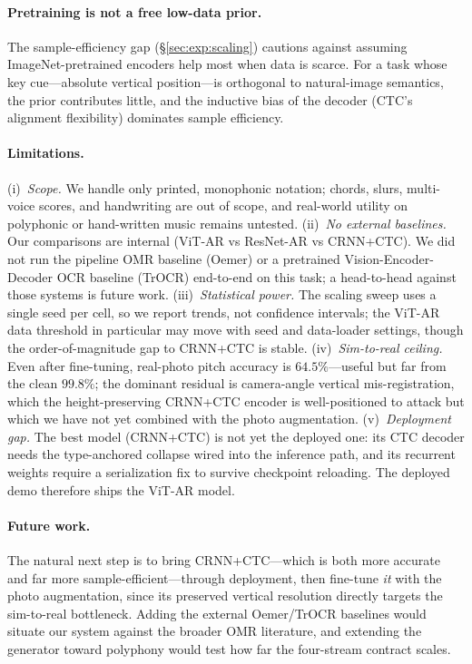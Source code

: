 \paragraph{Pretraining is not a free low-data prior.} The sample-efficiency gap
(\S\ref{sec:exp:scaling}) cautions against assuming ImageNet-pretrained encoders
help most when data is scarce. For a task whose key cue---absolute vertical
position---is orthogonal to natural-image semantics, the prior contributes little,
and the inductive bias of the decoder (CTC's alignment flexibility) dominates
sample efficiency.

\paragraph{Limitations.} (i)~\emph{Scope.} We handle only printed, monophonic
notation; chords, slurs, multi-voice scores, and handwriting are out of scope, and
real-world utility on polyphonic or hand-written music remains untested.
(ii)~\emph{No external baselines.} Our comparisons are internal (ViT-AR vs
ResNet-AR vs CRNN+CTC). We did not run the pipeline OMR baseline (Oemer) or a
pretrained Vision-Encoder-Decoder OCR baseline (TrOCR) end-to-end on this task; a
head-to-head against those systems is future work. (iii)~\emph{Statistical power.}
The scaling sweep uses a single seed per cell, so we report trends, not confidence
intervals; the ViT-AR data threshold in particular may move with seed and
data-loader settings, though the order-of-magnitude gap to CRNN+CTC is stable.
(iv)~\emph{Sim-to-real ceiling.} Even after fine-tuning, real-photo pitch accuracy
is $64.5\%$---useful but far from the clean $99.8\%$; the dominant residual is
camera-angle vertical mis-registration, which the height-preserving CRNN+CTC
encoder is well-positioned to attack but which we have not yet combined with the
photo augmentation. (v)~\emph{Deployment gap.} The best model (CRNN+CTC) is not
yet the deployed one: its CTC decoder needs the type-anchored collapse wired into
the inference path, and its recurrent weights require a serialization fix to
survive checkpoint reloading. The deployed demo therefore ships the ViT-AR model.

\paragraph{Future work.} The natural next step is to bring CRNN+CTC---which is both
more accurate and far more sample-efficient---through deployment, then fine-tune
\emph{it} with the photo augmentation, since its preserved vertical resolution
directly targets the sim-to-real bottleneck. Adding the external Oemer/TrOCR
baselines would situate our system against the broader OMR literature, and
extending the generator toward polyphony would test how far the four-stream
contract scales.
